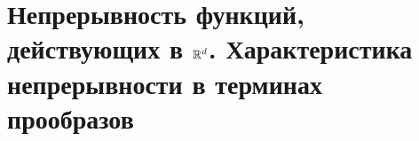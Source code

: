 \section{Непрерывность функций, действующих в $\mathbb{R}^d$. Характеристика непрерывности в терминах прообразов}